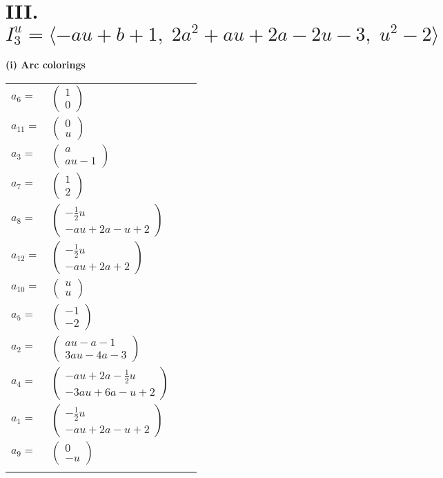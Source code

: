 \documentclass[1p]{elsarticle_modified}
\theoremstyle{definition}
\begin{document}
\centering \section*{III. $I^u_{3}= \langle - a u+b+1,\;2 a^2+a u+2 a-2 u-3,\;u^2-2 \rangle$}
\flushleft \textbf{(i) Arc colorings}\\
\begin{tabular}{m{7pt} m{180pt} m{7pt} m{180pt} }
\flushright $a_{6}=$&$\begin{pmatrix}1\\0\end{pmatrix}$ \\
\flushright $a_{11}=$&$\begin{pmatrix}0\\u\end{pmatrix}$ \\
\flushright $a_{3}=$&$\begin{pmatrix}a\\a u-1\end{pmatrix}$ \\
\flushright $a_{7}=$&$\begin{pmatrix}1\\2\end{pmatrix}$ \\
\flushright $a_{8}=$&$\begin{pmatrix}-\frac{1}{2} u\\- a u+2 a- u+2\end{pmatrix}$ \\
\flushright $a_{12}=$&$\begin{pmatrix}-\frac{1}{2} u\\- a u+2 a+2\end{pmatrix}$ \\
\flushright $a_{10}=$&$\begin{pmatrix}u\\u\end{pmatrix}$ \\
\flushright $a_{5}=$&$\begin{pmatrix}-1\\-2\end{pmatrix}$ \\
\flushright $a_{2}=$&$\begin{pmatrix}a u- a-1\\3 a u-4 a-3\end{pmatrix}$ \\
\flushright $a_{4}=$&$\begin{pmatrix}- a u+2 a-\frac{1}{2} u\\-3 a u+6 a- u+2\end{pmatrix}$ \\
\flushright $a_{1}=$&$\begin{pmatrix}-\frac{1}{2} u\\- a u+2 a- u+2\end{pmatrix}$ \\
\flushright $a_{9}=$&$\begin{pmatrix}0\\- u\end{pmatrix}$\\&\end{tabular}
\end{document}
